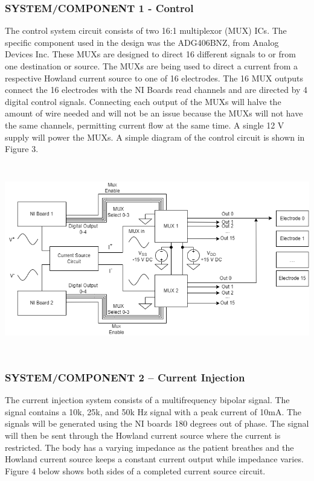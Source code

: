 \documentclass[12pt]{article}
\begin{document}
\subsubsection{SYSTEM/COMPONENT 1 - Control}\label{systemcomponent-1---control}

The control system circuit consists of two 16:1 multiplexor (MUX) ICs.
The specific component used in the design was the ADG406BNZ, from Analog
Devices Inc. These MUXs are designed to direct 16 different signals to
or from one destination or source. The MUXs are being used to direct a
current from a respective Howland current source to one of 16
electrodes. The 16 MUX outputs connect the 16 electrodes with the NI
Boards read channels and are directed by 4 digital control signals.
Connecting each output of the MUXs will halve the amount of wire needed
and will not be an issue because the MUXs will not have the same
channels, permitting current flow at the same time. A single 12 V supply
will power the MUXs. A simple diagram of the control circuit is shown in
Figure 3.

\includegraphics[width=6.5in,height=3.28889in]{media/image5.png}

\subsubsection{SYSTEM/COMPONENT 2 -- Current Injection}\label{systemcomponent-2-current-injection}

The current injection system consists of a multifrequency bipolar
signal. The signal contains a 10k, 25k, and 50k Hz signal with a peak
current of 10mA. The signals will be generated using the NI boards 180
degrees out of phase. The signal will then be sent through the Howland
current source where the current is restricted. The body has a varying
impedance as the patient breathes and the Howland current source keeps a
constant current output while impedance varies. Figure 4 below shows
both sides of a completed current source circuit.
\end{document}
